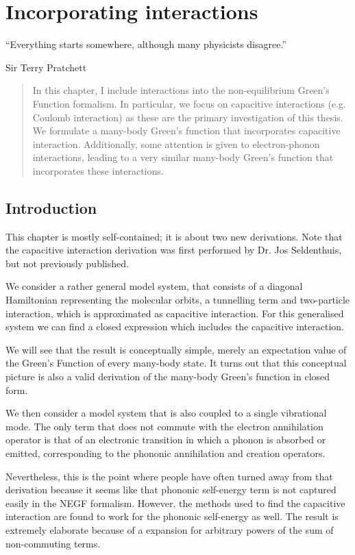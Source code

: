 \chapter{Incorporating interactions}
\label{ch:chapter_3}

\epigraph{
    “Everything starts somewhere, although many physicists disagree.”
}{Sir Terry Pratchett}

\begin{abstract}
In this chapter, I include interactions into the non-equilibrium Green's Function formalism. In particular, we focus on capacitive interactions (e.g. Coulomb interaction) as these are the primary investigation of this thesis. We formulate a many\hyp{}body Green's function that incorporates capacitive interaction. Additionally, some attention is given to electron-phonon interactions, leading to a very similar many-body Green's function that incorporates these interactions.
\end{abstract}

\newpage
\section{Introduction}
This chapter is mostly self-contained; it is about two new derivations. Note that the capacitive interaction derivation was first performed by Dr. Jos Seldenthuis, but not previously published.

We consider a rather general model system, that consists of a diagonal Hamiltonian representing the molecular orbits, a tunnelling term and  two-particle interaction, which is approximated as capacitive interaction. For this generalised system we can find a closed expression which includes the capacitive interaction.

We will see that the result is conceptually simple, merely an expectation value of the Green's Function of every many-body state. It turns out that this conceptual picture is also a valid derivation of the many-body Green's function in closed form.

We then consider a model system that is also coupled to a single vibrational mode. The only term that does not commute with the electron annihilation operator is that of an electronic transition in which a phonon is absorbed or emitted, corresponding to the phononic annihilation and creation operators.

Nevertheless, this is the point where people have often turned away from that derivation because it seems like that phononic self\hyp{}energy term is not captured easily in the NEGF formalism. However, the methods used to find the capacitive interaction are found to work for the phononic self-energy as well. The result is extremely elaborate because of a expansion for arbitrary powers of the sum of non-commuting terms. 

